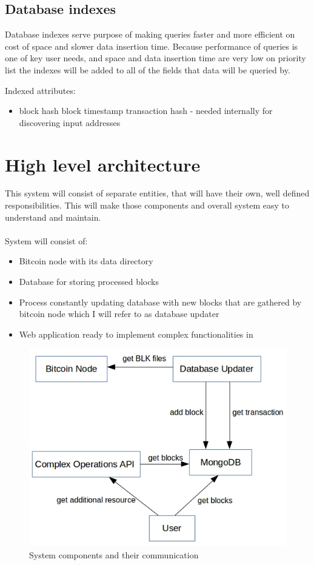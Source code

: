 \documentclass[12pt, en, eng, oneside]{mgr}
\begin{document}
 

\subsection{Database indexes}

Database indexes serve purpose of making queries faster and more efficient on cost of space and slower data insertion time.
Because performance of queries is one of key user needs, and space and data insertion time are very low on priority list the indexes will be added to all of the fields that data will be queried by.

Indexed attributes:
\begin{itemize}
\item
block hash
block timestamp
transaction hash - needed internally for discovering input addresses
\end{itemize} 


\section{High level architecture}
This system will consist of separate entities, that will have their own, well defined responsibilities. This will make those components and overall system easy to understand and maintain.
\\
\\
System will consist of:
\begin{itemize}
\item
Bitcoin node with its data directory
\item
Database for storing processed blocks
\item
Process constantly updating database with new blocks that are gathered by bitcoin node which I will refer to as database updater
\item
Web application ready to implement complex functionalities in
\end{itemize}

\begin{figure}[H]
  \includegraphics[width=0.8\linewidth]{component-diagram.png}
  \caption{System components and their communication}
  \label{fig:system-components-and-their-communication}
\end{figure}
\end{document}
